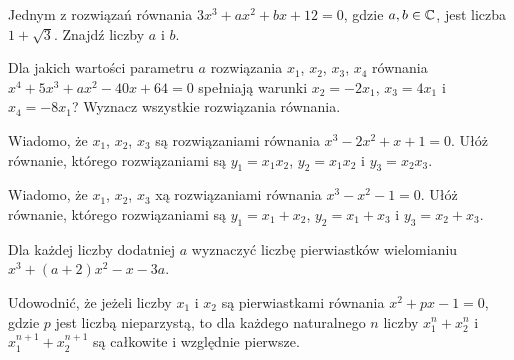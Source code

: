 \documentclass{article}
\begin{document}
\begin{zadanie}
  Jednym z rozwiązań równania $3x^3+ax^2+bx+12=0$, gdzie $a,b\in\mathbb{C}$, jest liczba $1+\sqrt{3}$. Znajdź liczby $a$ i $b$.
\end{zadanie}

\begin{zadanie}
  Dla jakich wartości parametru $a$ rozwiązania $x_1$, $x_2$, $x_3$, $x_4$ równania $x^4+5x^3+ax^2-40x+64=0$ spełniają warunki $x_2=-2x_1$, $x_3=4x_1$ i $x_4=-8x_1$? Wyznacz wszystkie rozwiązania równania. 
\end{zadanie}

\begin{zadanie}
  Wiadomo, że $x_1$, $x_2$, $x_3$ są rozwiązaniami równania $x^3-2x^2+x+1=0$. Ułóż równanie, którego rozwiązaniami są $y_1=x_1x_2$, $y_2=x_1x_2$ i $y_3=x_2x_3$.
\end{zadanie}

\begin{zadanie}
  Wiadomo, że $x_1$, $x_2$, $x_3$ xą rozwiązaniami równania $x^3-x^2-1=0$. Ułóż równanie, którego rozwiązaniami są $y_1=x_1+x_2$, $y_2=x_1+x_3$ i $y_3=x_2+x_3$.
\end{zadanie}

\begin{zadanie}
  Dla każdej liczby dodatniej $a$ wyznaczyć liczbę pierwiastków wielomianiu $x^3+(a+2)x^2-x-3a$.
\end{zadanie}

\begin{zadanie}
  Udowodnić, że jeżeli liczby $x_1$ i $x_2$ są pierwiastkami równania $x^2+px-1=0$, gdzie $p$ jest liczbą nieparzystą, to dla każdego naturalnego $n$ liczby $x_1^n+x_2^n$ i $x_1^{n+1}+x_2^{n+1}$ są całkowite i względnie pierwsze.
\end{zadanie}
%
\end{document}
